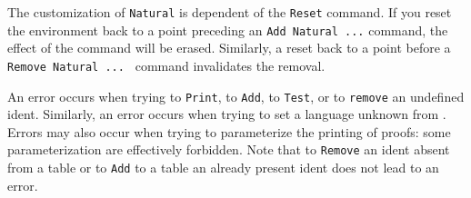 
The customization of \texttt{Natural} is dependent of the \texttt{Reset}
command. If you reset the environment back to a point preceding an
\verb=Add Natural ...= command, the effect of the command will be
erased. Similarly, a reset back to a point before a 
\verb=Remove Natural ... = command invalidates the removal.


An error occurs when trying to \verb=Print=, to \verb=Add=, to
\verb=Test=, or to \verb=remove= an undefined ident. Similarly, an
error occurs when trying to set a language unknown from \Natural.
Errors may also occur when trying to parameterize the printing of
proofs: some parameterization are effectively forbidden.
Note that to \verb=Remove= an ident absent from a table or to
\verb=Add= to a table an already present ident does not lead to an
error.

